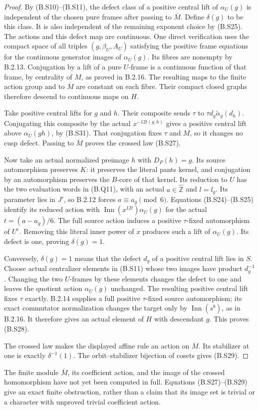\begin{proof}
By (B.S10)--(B.S11), the defect class of a positive
central lift of $\alpha_U(g)$ is independent of the
chosen pure frames after passing to $\overline M$.
Define $\delta(g)$ to be this class.  It is also
independent of the remaining exponent choice by
(B.S25).  The actions and this defect map are
continuous.  One direct verification uses the compact
space of all triples $(g,\beta_U,A_U)$ satisfying the
positive frame equations for the continuous generator
images of $\alpha_U(g)$.  Its fibres are nonempty by
B.2.13.  Conjugation by a lift of a pure $U$-frame is
a continuous function of that frame, by centrality
of $M$, as proved in B.2.16.  The resulting maps to
the finite action group and to $\overline M$ are
constant on each fibre.  Their compact closed graphs
therefore descend to continuous maps on $H$.

Take positive central lifts for $g$ and $h$.
Their composite sends $\tau$ to
$\tau d_g\widetilde\alpha_g(d_h)$.
Conjugating this composite by the actual
$x^{-12t(g,h)}$ gives a positive central lift above
$\alpha_U(gh)$, by (B.S31).  That conjugation fixes
$\tau$ and $M$, so it changes no cusp defect.
Passing to $\overline M$ proves the crossed law
(B.S27).

Now take an actual normalized preimage $h$ with
$D_P(h)=g$.  Its source automorphism preserves $K$:
it preserves the literal pants kernel, and
conjugation by an automorphism preserves the $B$-core
of that kernel.  Its reduction to $U$ has the two
evaluation words in (B.Q11), with an actual
$a\in\widehat{\mathbb Z}$ and $l=l_g$.
Its parameter lies in $J'$, so B.2.12 forces
$a\equiv a_g\pmod6$.  Equations (B.S24)--(B.S25)
identify its reduced action with
$\operatorname{Inn}(x^{12t})\alpha_U(g)$ for the
actual $t=(a-a_g)/6$.  The full source action induces
a positive $\tau$-fixed automorphism of
$U^{\mathrm c}$.  Removing this literal inner power
of $x$ produces such a lift of $\alpha_U(g)$.
Its defect is one, proving $\delta(g)=1$.

Conversely, $\delta(g)=1$ means that the defect
$d_g$ of a positive central lift lies in $S$.
Choose actual centralizer elements in (B.S11) whose
two images have product $d_g^{-1}$.  Changing the
two $U$-frames by these elements changes the defect
to one and leaves the quotient action $\alpha_U(g)$
unchanged.  The resulting positive central lift
fixes $\tau$ exactly.  B.2.14 supplies a full positive
$\tau$-fixed source automorphism; its exact
commutator normalization changes the target only
by $\operatorname{Inn}(s^b)$, as in B.2.16.
It therefore gives an actual element of $H$ with
descendant $g$.  This proves (B.S28).

The crossed law makes the displayed affine rule an
action on $\overline M$.  Its stabilizer at one is
exactly $\delta^{-1}(1)$.  The orbit--stabilizer
bijection of cosets gives (B.S29).
\end{proof}

The finite module $\overline M$, its coefficient action,
and the image of the crossed homomorphism have not yet
been computed in full.  Equations (B.S27)--(B.S29)
give an exact finite obstruction, rather than a claim
that its image set is trivial or a character with
unproved trivial coefficient action.
